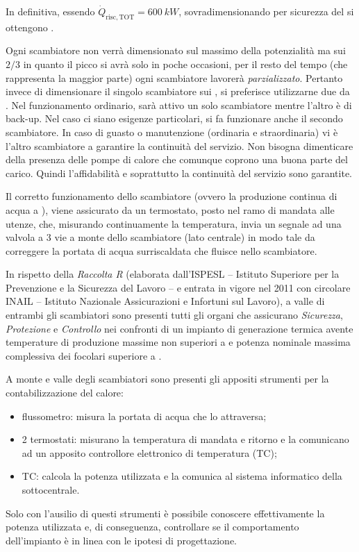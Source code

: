 In definitiva, essendo $\dot{Q}_{\mathrm{risc,TOT}}=\SI{600}{kW}$, sovradimensionando per sicurezza del  si ottengono . 

Ogni scambiatore non verrà dimensionato sul massimo della potenzialità ma sui $2/3$ in quanto il picco si avrà solo in poche occasioni, per il resto del tempo (che rappresenta la maggior parte) ogni scambiatore lavorerà \emph{parzializzato}. Pertanto invece di dimensionare il singolo scambiatore sui , si preferisce utilizzarne due da . Nel funzionamento ordinario, sarà attivo un solo scambiatore mentre l'altro è di back-up. Nel caso ci siano esigenze particolari, si fa funzionare anche il secondo scambiatore. In caso di guasto o manutenzione (ordinaria e straordinaria) vi è l'altro scambiatore a garantire la continuità del servizio. Non bisogna dimenticare della presenza delle pompe di calore che comunque coprono una buona parte del carico. Quindi l'affidabilità e soprattutto la continuità del servizio sono garantite.

Il corretto funzionamento dello scambiatore (ovvero la produzione continua di acqua a ), viene assicurato da un termostato, posto nel ramo di mandata alle utenze, che, misurando continuamente la temperatura, invia un segnale ad una valvola a 3 vie a monte dello scambiatore (lato centrale) in modo tale da correggere la portata di acqua surriscaldata che fluisce nello scambiatore. 

In rispetto della \emph{Raccolta R} (elaborata dall'ISPESL -- Istituto Superiore per la Prevenzione e la Sicurezza del Lavoro -- e entrata in vigore nel \num{2011} con circolare INAIL -- Istituto Nazionale Assicurazioni e Infortuni sul Lavoro), a valle di entrambi gli scambiatori sono presenti tutti gli organi che assicurano \emph{Sicurezza}, \emph{Protezione} e \emph{Controllo} nei confronti di un impianto di generazione termica avente temperature di produzione massime non superiori a  e potenza nominale massima complessiva dei focolari superiore a .

A monte e valle degli scambiatori sono presenti gli appositi strumenti per la contabilizzazione del calore:
\begin{itemize}
	\item flussometro: misura la portata di acqua che lo attraversa;
	\item 2 termostati: misurano la temperatura di mandata e ritorno e la comunicano ad un apposito controllore elettronico di temperatura (TC);
	\item TC: calcola la potenza utilizzata e la comunica al sistema informatico della sottocentrale. 
\end{itemize}
Solo con l'ausilio di questi strumenti è possibile conoscere effettivamente la potenza utilizzata e, di conseguenza, controllare se il comportamento dell'impianto è in linea con le ipotesi di progettazione.

